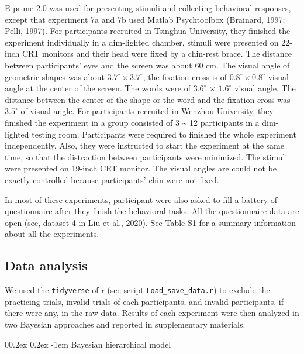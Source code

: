 \documentclass[
  english,
  man]{apa6}
\makeatletter
\let\oldparagraph\paragraph
\renewcommand{\paragraph}[1]{\oldparagraph{#1}\mbox{}}
\renewcommand{\paragraph}{\@startsection{paragraph}{4}{\parindent}%
  {0\baselineskip \@plus 0.2ex \@minus 0.2ex}%
  {-1em}%
  {\normalfont\normalsize\bfseries\itshape\typesectitle}}
\makeatother
\begin{document}
E-prime 2.0 was used for presenting stimuli and collecting behavioral responses, except that experiment 7a and 7b used Matlab Psychtoolbox (Brainard, 1997; Pelli, 1997). For participants recruited in Tsinghua University, they finished the experiment individually in a dim-lighted chamber, stimuli were presented on 22-inch CRT monitors and their head were fixed by a chin-rest brace. The distance between participants' eyes and the screen was about 60 cm. The visual angle of geometric shapes was about \(3.7^\circ × 3.7^\circ\), the fixation cross is of \(0.8^\circ × 0.8^\circ\) visual angle at the center of the screen. The words were of \(3.6^\circ\) × \(1.6^\circ\) visual angle. The distance between the center of the shape or the word and the fixation cross was \(3.5^\circ\) of visual angle. For participants recruited in Wenzhou University, they finished the experiment in a group consisted of 3 \textasciitilde{} 12 participants in a dim-lighted testing room. Participants were required to finished the whole experiment independently. Also, they were instructed to start the experiment at the same time, so that the distraction between participants were minimized. The stimuli were presented on 19-inch CRT monitor. The visual angles are could not be exactly controlled because participants' chin were not fixed.

In most of these experiments, participant were also asked to fill a battery of questionnaire after they finish the behavioral tasks. All the questionnaire data are open (see, dataset 4 in Liu et al., 2020). See Table S1 for a summary information about all the experiments.

\hypertarget{data-analysis}{%
\subsection{Data analysis}\label{data-analysis}}

We used the \texttt{tidyverse} of r (see script \texttt{Load\_save\_data.r}) to exclude the practicing trials, invalid trials of each participants, and invalid participants, if there were any, in the raw data. Results of each experiment were then analyzed in two Bayesian approaches and reported in supplementary materials.

\hypertarget{bayesian-hierarchical-model}{%
\paragraph{Bayesian hierarchical model}\label{bayesian-hierarchical-model}}
\end{document}
